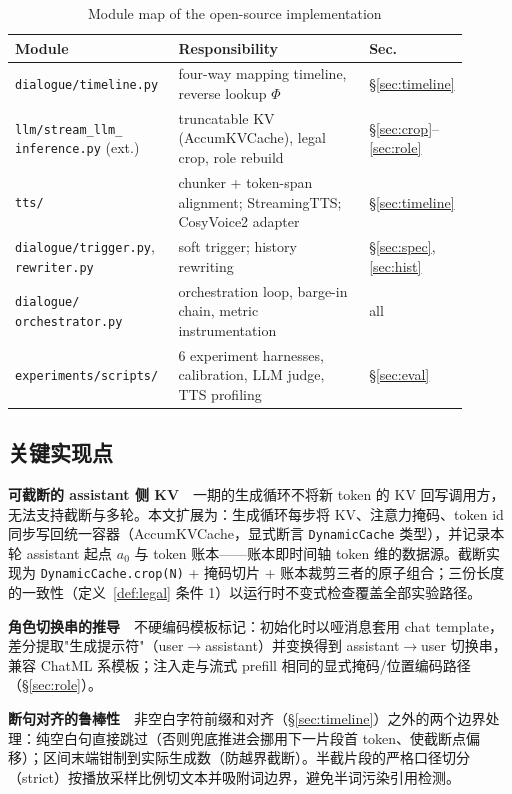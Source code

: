 \documentclass[conference]{IEEEtran}
\theoremstyle{definition}
\begin{document}
\begin{table}[t]
\caption{Module map of the open-source implementation}
\label{tab:modules}
\centering
\scriptsize
\begin{tabular}{@{}p{0.36\linewidth}p{0.42\linewidth}p{0.12\linewidth}@{}}
\toprule
Module & Responsibility & Sec. \\
\midrule
\texttt{dialogue/timeline.py} & four-way mapping timeline, reverse lookup $\Phi$ & \S\ref{sec:timeline} \\
\texttt{llm/stream\_llm\_} \texttt{inference.py} (ext.) & truncatable KV (AccumKVCache), legal crop, role rebuild & \S\ref{sec:crop}--\ref{sec:role} \\
\texttt{tts/} & chunker + token-span alignment; StreamingTTS; CosyVoice2 adapter & \S\ref{sec:timeline} \\
\texttt{dialogue/trigger.py}, \texttt{rewriter.py} & soft trigger; history rewriting & \S\ref{sec:spec}, \ref{sec:hist} \\
\texttt{dialogue/} \texttt{orchestrator.py} & orchestration loop, barge-in chain, metric instrumentation & all \\
\texttt{experiments/scripts/} & 6 experiment harnesses, calibration, LLM judge, TTS profiling & \S\ref{sec:eval} \\
\bottomrule
\end{tabular}
\end{table}

\subsection{关键实现点}
\textbf{可截断的 assistant 侧 KV}　一期的生成循环不将新 token 的 KV 回写调用方，无法支持截断与多轮。本文扩展为：生成循环每步将 KV、注意力掩码、token id 同步写回统一容器（AccumKVCache，显式断言 \texttt{DynamicCache} 类型），并记录本轮 assistant 起点 $a_0$ 与 token 账本——账本即时间轴 token 维的数据源。截断实现为 \texttt{DynamicCache.crop(N)} + 掩码切片 + 账本裁剪三者的原子组合；三份长度的一致性（定义~\ref{def:legal} 条件 1）以运行时不变式检查覆盖全部实验路径。

\textbf{角色切换串的推导}　不硬编码模板标记：初始化时以哑消息套用 chat template，差分提取"生成提示符"（user$\rightarrow$assistant）并变换得到 assistant$\rightarrow$user 切换串，兼容 ChatML 系模板；注入走与流式 prefill 相同的显式掩码/位置编码路径（\S\ref{sec:role}）。

\textbf{断句对齐的鲁棒性}　非空白字符前缀和对齐（\S\ref{sec:timeline}）之外的两个边界处理：纯空白句直接跳过（否则兜底推进会挪用下一片段首 token、使截断点偏移）；区间末端钳制到实际生成数（防越界截断）。半截片段的严格口径切分（strict）按播放采样比例切文本并吸附词边界，避免半词污染引用检测。
\end{document}
